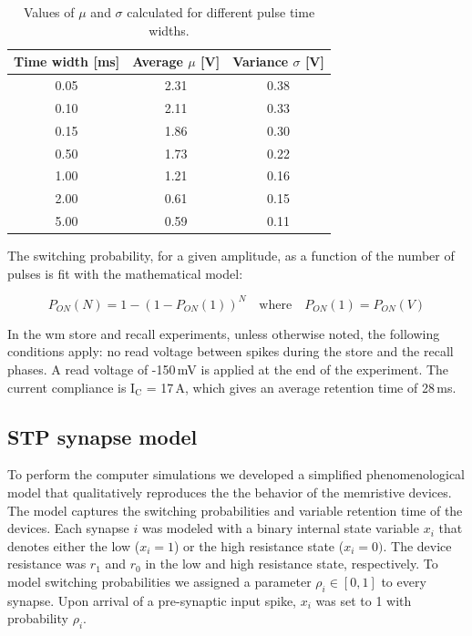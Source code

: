 \begin{table}[ht]
    \centering
    \caption{Values of $\mu$ and $\sigma$ calculated for different pulse time widths.}
    \begin{tabular}{|c|c|c|}
        \hline
        \textbf{Time width [ms]} & \textbf{Average $\mu$ [V]} & \textbf{Variance $\sigma$ [V]} \\
        \hline
        0.05 & 2.31 & 0.38 \\
        \hline
        0.10 & 2.11 & 0.33 \\
        \hline
        0.15 & 1.86 & 0.30 \\
        \hline
        0.50 & 1.73 & 0.22 \\
        \hline
        1.00 & 1.21 & 0.16 \\
        \hline
        2.00 & 0.61 & 0.15 \\
        \hline
        5.00 & 0.59 & 0.11 \\
        \hline
    \end{tabular}
    \label{tab:tab1}
\end{table}

The switching probability, for a given amplitude, as a function of the number of pulses is fit with the mathematical model: 

\begin{equation} 
\label{eqPON_N}
P_{ON}(N) = 1 - (1 - P_{ON}(1))^N\quad \mathrm{where} \quad P_{ON}(1) = P_{ON}(V)
\end{equation}

In the \gls{wm} store and recall experiments, unless otherwise noted, the following conditions apply: no read voltage between spikes during the store and the recall phases. A read voltage of -150\,mV is applied at the end of the experiment. The current compliance is I$\mathrm{_C}$ = 17\,\textmu A, which gives an average retention time of 28\,ms.

\subsection{STP synapse model}
\label{sec:stpwmm}

To perform the computer simulations we developed a simplified phenomenological model that qualitatively reproduces the the behavior of the memristive devices. The model captures the switching probabilities and variable retention time of the devices. Each synapse $i$ was modeled with a binary internal state variable $x_i$ that denotes either the low ($x_i=1$) or the high resistance state ($x_i=0)$. The device resistance was $r_1$ and $r_0$ in the low and high resistance state, respectively. To model switching probabilities we assigned a parameter $\rho_i \in [0,1]$ to every synapse. Upon arrival of a pre-synaptic input spike, $x_i$ was set to 1 with probability $\rho_i$.

